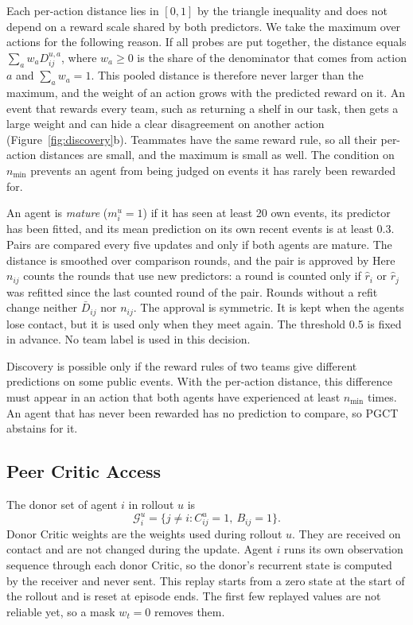 \documentclass{article}
\begin{document}
Each per-action distance lies in $[0,1]$ by the triangle inequality and does not depend on a reward scale shared by both predictors. We take the maximum over actions for the following reason. If all probes are put together, the distance equals $\sum_a w_aD_{ij}^{u,a}$, where $w_a\ge0$ is the share of the denominator that comes from action $a$ and $\sum_a w_a=1$. This pooled distance is therefore never larger than the maximum, and the weight of an action grows with the predicted reward on it. An event that rewards every team, such as returning a shelf in our task, then gets a large weight and can hide a clear disagreement on another action (Figure~\ref{fig:discovery}b). Teammates have the same reward rule, so all their per-action distances are small, and the maximum is small as well. The condition on $n_{\min}$ prevents an agent from being judged on events it has rarely been rewarded for.

An agent is \emph{mature} ($m_i^u=1$) if it has seen at least 20 own events, its predictor has been fitted, and its mean prediction on its own recent events is at least 0.3. Pairs are compared every five updates and only if both agents are mature. The distance is smoothed over comparison rounds, and the pair is approved by
\ApprovalEquation
Here $n_{ij}$ counts the rounds that use new predictors: a round is counted only if $\widehat r_i$ or $\widehat r_j$ was refitted since the last counted round of the pair. Rounds without a refit change neither $\bar D_{ij}$ nor $n_{ij}$. The approval is symmetric. It is kept when the agents lose contact, but it is used only when they meet again. The threshold 0.5 is fixed in advance. No team label is used in this decision.

Discovery is possible only if the reward rules of two teams give different predictions on some public events. With the per-action distance, this difference must appear in an action that both agents have experienced at least $n_{\min}$ times. An agent that has never been rewarded has no prediction to compare, so PGCT abstains for it.

\subsection{Peer Critic Access}
The donor set of agent $i$ in rollout $u$ is
\begin{equation}\label{eq:donorset}
\mathcal G_i^u=\{j\ne i: C_{ij}^u=1,\ B_{ij}=1\}.
\end{equation}
Donor Critic weights are the weights used during rollout $u$. They are received on contact and are not changed during the update. Agent $i$ runs its own observation sequence through each donor Critic, so the donor's recurrent state is computed by the receiver and never sent. This replay starts from a zero state at the start of the rollout and is reset at episode ends. The first few replayed values are not reliable yet, so a mask $w_t=0$ removes them.
\end{document}
